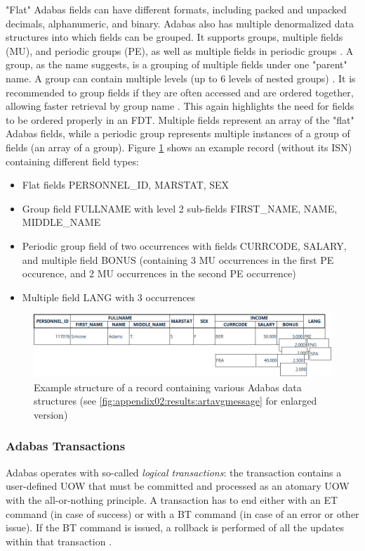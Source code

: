 "Flat" Adabas fields can have different formats, including packed and unpacked decimals, alphanumeric, and binary. Adabas also has multiple denormalized data structures into which fields can be grouped. It supports groups, multiple fields (MU), and periodic groups (PE), as well as multiple fields in periodic groups \cite{aebi1996reengineering}. A group, as the name suggests, is a grouping of multiple fields under one "parent" name. A group can contain multiple levels (up to 6 levels of nested groups) \cite{storr1994effizienter}. It is recommended to group fields if they are often accessed and are ordered together, allowing faster retrieval by group name \cite{adabasconcepts}. This again highlights the need for fields to be ordered properly in an \ac{FDT}. Multiple fields represent an array of the "flat" Adabas fields, while a periodic group represents multiple instances of a group of fields (an array of a group). Figure \ref{fig:fundamentals:datastructure} shows an example record (without its \ac{ISN}) containing different field types:
\begin{itemize}
    \item Flat fields PERSONNEL\_ID, MARSTAT, SEX
    \item Group field FULLNAME with level 2 sub-fields FIRST\_NAME, NAME, MIDDLE\_NAME
    \item Periodic group field of two occurrences with fields CURRCODE, SALARY, and multiple field BONUS (containing 3 MU occurrences in the first PE occurence, and 2 MU occurrences in the second PE occurrence)
    \item Multiple field LANG with 3 occurrences
\end{itemize}

\begin{figure}[htbp]
 \centering
 \includegraphics[width=1\textwidth]{chapters/images/datastructures.png}
 \caption[Example structure of a record containing various Adabas data structures]{Example structure of a record containing various Adabas data structures (see \ref{fig:appendix02:results:artavgmessage} for enlarged version)}
 \label{fig:fundamentals:datastructure}
\end{figure}

\subsubsection{Adabas Transactions}
\label{ch02:fundamentals:adabas:forzos:transactions}
Adabas operates with so-called \textit{logical transactions}: the transaction contains a user-defined \ac{UOW} that must be committed and processed as an atomary \ac{UOW} with the all-or-nothing principle. A transaction has to end either with an \ac{ET} command (in case of success) or with a \ac{BT} command (in case of an error or other issue). If the \ac{BT} command is issued, a rollback is performed of all the updates within that transaction \cite{adabasconcepts}.

